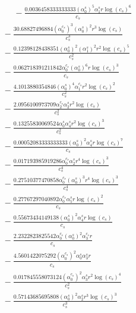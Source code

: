 \documentclass[10pt]{article}
\begin{document}
\begin{align*}
\phantom{R_{0,8}} &\phantom{={}}{}  - \frac{0.0036458333333333 \left(\alpha_{0}^s\right)^{5} \alpha_{1}^s r \log{\left(c_{s} \right)}^{6}}{c_{s}} \\
&{}  - \frac{30.68827496884 \left(\alpha_{0}^{c_s}\right)^{3} \left(\alpha_{0}^s\right)^{2} r^{3} \log{\left(c_{s} \right)}}{c_{s}^{3}} \\
&{}  - \frac{0.12398128438351 \left(\alpha_{0}^s\right)^{2} \left(\alpha_{1}^s\right)^{2} r^{2} \log{\left(c_{s} \right)}^{5}}{c_{s}^{2}} \\
&{}  - \frac{0.062718391211842 \alpha_{0}^{c_s} \left(\alpha_{0}^s\right)^{6} r \log{\left(c_{s} \right)}^{3}}{c_{s}} \\
&{}  - \frac{4.1013880354846 \left(\alpha_{0}^s\right)^{4} \alpha_{1}^{c_s} r^{2} \log{\left(c_{s} \right)}^{2}}{c_{s}^{2}} \\
&{}  - \frac{2.0956100973709 \alpha_{2}^{c_s} \alpha_{2}^s r^{2} \log{\left(c_{s} \right)}}{c_{s}^{2}} \\
&{}  - \frac{0.13255830069524 \alpha_{0}^s \alpha_{4}^s r^{2} \log{\left(c_{s} \right)}^{3}}{c_{s}^{2}} \\
&{}  - \frac{0.00052083333333333 \left(\alpha_{0}^s\right)^{2} \alpha_{4}^s r \log{\left(c_{s} \right)}^{7}}{c_{s}} \\
&{}  - \frac{0.017193985919286 \alpha_{0}^{c_s} \alpha_{2}^s r^{4} \log{\left(c_{s} \right)}^{3}}{c_{s}^{4}} \\
&{}  - \frac{0.27510377470858 \alpha_{0}^{c_s} \left(\alpha_{0}^s\right)^{3} r^{4} \log{\left(c_{s} \right)}^{3}}{c_{s}^{4}} \\
&{}  - \frac{0.27767297040892 \alpha_{0}^{c_s} \alpha_{5}^s r \log{\left(c_{s} \right)}^{2}}{c_{s}} \\
&{}  - \frac{0.55673434149138 \left(\alpha_{0}^s\right)^{2} \alpha_{4}^s r \log{\left(c_{s} \right)}}{c_{s}} \\
&{}  - \frac{2.2322823825542 \alpha_{0}^{c_s} \left(\alpha_{0}^s\right)^{2} \alpha_{3}^{c_s} r}{c_{s}} \\
&{}  - \frac{4.5601422075292 \left(\alpha_{0}^{c_s}\right)^{2} \alpha_{0}^s \alpha_{3}^s r}{c_{s}} \\
&{}  - \frac{0.017845558073124 \left(\alpha_{0}^{c_s}\right)^{2} \alpha_{3}^s r^{2} \log{\left(c_{s} \right)}^{4}}{c_{s}^{2}} \\
&{}  - \frac{0.57143685695808 \left(\alpha_{0}^s\right)^{2} \alpha_{2}^s r^{3} \log{\left(c_{s} \right)}^{3}}{c_{s}^{3}} \\

\end{align*}
\end{document}
